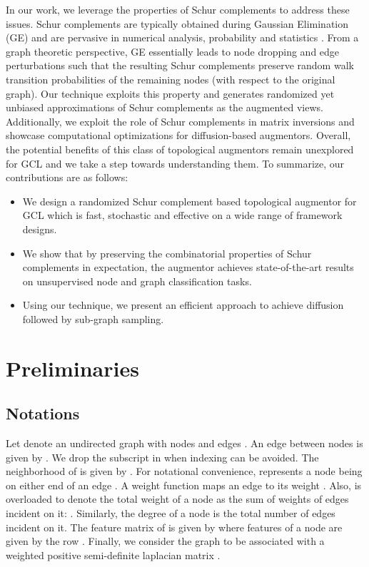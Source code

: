 \documentclass{article}
\theoremstyle{plain}
\theoremstyle{definition}
\theoremstyle{remark}
\begin{document}
In our work, we leverage the properties of Schur complements to address these issues. Schur complements are typically obtained during Gaussian Elimination (GE) and are pervasive in numerical analysis, probability and statistics \citep{cottle1974manifestations, ouellette1981schur, zhang2006schur}. From a graph theoretic perspective, GE essentially leads to node dropping and edge perturbations such that the resulting Schur complements preserve random walk transition probabilities of the remaining nodes (with respect to the original graph). Our technique exploits this property and generates randomized yet unbiased approximations of Schur complements as the augmented views. Additionally, we exploit the role of Schur complements in matrix inversions and showcase computational optimizations for diffusion-based augmentors. Overall, the potential benefits of this class of topological augmentors remain unexplored for GCL and we take a step towards understanding them. To summarize, our contributions are as follows:
\begin{itemize}
    \item We design a randomized Schur complement based topological augmentor for GCL which is fast, stochastic and effective on a wide range of framework designs.
    \item We show that by preserving the combinatorial properties of Schur complements in expectation, the augmentor achieves state-of-the-art results on unsupervised node and graph classification tasks.
    \item Using our technique, we present an efficient approach to achieve diffusion followed by sub-graph sampling.
\end{itemize}

\section{Preliminaries}
\subsection{Notations}
Let  denote an undirected graph with nodes  and edges . An edge between nodes  is given by . We drop the subscript in  when indexing can be avoided. The neighborhood of  is given by . For notational convenience,  represents a node  being on either end of an edge . A weight function  maps an edge  to its weight . Also,  is overloaded to denote the total weight of a node as the sum of weights of edges incident on it: . Similarly, the degree of a node  is the total number of edges incident on it. The feature matrix of  is given by  where features of a node  are given by the row . Finally, we consider the graph  to be associated with a weighted positive semi-definite laplacian matrix . 
\end{document}
